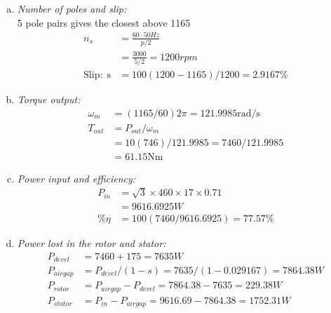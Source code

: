 \documentclass[a4paper,11pt]{article}
\begin{document}
\begin{enumerate}[a)]
    \item \textit{Number of poles and slip:}\\
          5 pole pairs gives the closest above 1165
          \begin{align*}
              n_s               & =\frac{60{\cdot}50Hz}{p/2}    \\
                                & =\frac{3000}{5/2} = 1200rpm   \\
              \mathrm{Slip:\;s} & =100(1200-1165)/1200=2.9167\%
          \end{align*}

    \item \textit{Torque output:}\\
          \begin{align*}
              \omega_m & = (1165/60)2\pi =121.9985 \mathrm{rad/s} \\
              T_{out}  & = P_{out}/\omega_m                       \\
                       & = 10(746)/121.9985=7460/121.9985         \\
                       & =61.15\mathrm{Nm}
          \end{align*}

    \item \textit{Power input and efficiency:}\\
          \begin{align*}
              P_{in} & = \sqrt{3}\times460\times17\times0.71 \\
                     & =9616.6925W                           \\
              \%\eta & = 100(7460/9616.6925)=77.57\%
          \end{align*}

    \item \textit{Power lost in the rotor and stator:}\\
          \begin{align*}
              P_{devel}  & = 7460+175=7635W                               \\
              P_{airgap} & = P_{devel}/(1-s) = 7635/(1-0.029167)=7864.38W \\
              P_{rotor}  & = P_{airgap}-P_{devel} = 7864.38-7635=229.38W  \\
              P_{stator} & = P_{in}-P_{airgap}=9616.69-7864.38=1752.31W   \\
          \end{align*}
\end{enumerate}
\end{document}
